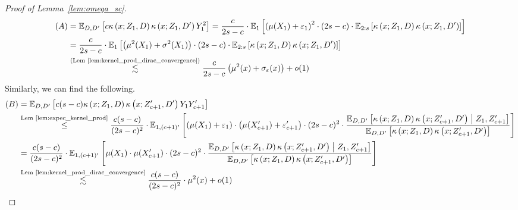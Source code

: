 \begin{proof}[Proof of Lemma~\ref{lem:omega_sc}]
\begin{equation}
		\begin{aligned}
            (A) & = 
			\mathbb{E}_{D, D^{\prime}}\left[c\kappa\left(x; Z_{1}, D\right)\kappa\left(x; Z_{1}, D^{\prime}\right)Y_{1}^{2}\right]
			= \frac{c}{2s-c} \cdot \mathbb{E}_{1}\left[\left(\mu(X_1) + \varepsilon_1\right)^2 \cdot (2s-c) \cdot \mathbb{E}_{2:s}\left[\kappa\left(x; Z_{1}, D\right)\kappa\left(x; Z_{1}, D^{\prime}\right)\right]\right] \\
            & = \frac{c}{2s-c} \cdot \mathbb{E}_{1}\left[\left(\mu^{2}(X_1) + \sigma^{2}(X_1)\right) \cdot (2s-c) \cdot \mathbb{E}_{2:s}\left[\kappa\left(x; Z_{1}, D\right)\kappa\left(x; Z_{1}, D^{\prime}\right)\right]\right]\\
		      & \overset{\text{(Lem~\ref{lem:kernel_prod_dirac_convergence})}}{\lesssim} \frac{c}{2s-c} \left(\mu^2(x) + \sigma_{\varepsilon}(x)\right) + o(1)
		\end{aligned}
	\end{equation}
	Similarly, we can find the following.
	\begin{equation}
		\begin{aligned}
            (B) & = \E_{D, D^{\prime}}\left[c(s-c) \kappa\left(x; Z_{1}, D\right)\kappa\left(x; Z_{c+1}^{\prime}, D^{\prime}\right)Y_{1}Y_{c+1}^{\prime}\right] \\
            & \overset{\text{Lem \ref{lem:expec_kernel_prod}}}{\leq} \frac{c(s-c)}{(2s-c)^2} \cdot
            \E_{1, (c+1)^{\prime}}\left[
                \left(\mu(X_1) + \varepsilon_{1}\right)\cdot\left(\mu(X_{c+1}^{\prime}) + \varepsilon_{c+1}^{\prime}\right) \cdot (2s-c)^2 
                \cdot \frac{\E_{D, D^{\prime}}\left[\kappa\left(x; Z_{1}, D\right)\kappa\left(x; Z_{c+1}^{\prime}, D^{\prime}\right) \; \middle| \; Z_{1}, Z_{c+1}^{\prime}\right]}{\E_{D, D^{\prime}}\left[\kappa\left(x; Z_{1}, D\right)\kappa\left(x; Z_{c+1}^{\prime}, D^{\prime}\right)\right]}
            \right]\\
            & = \frac{c(s-c)}{(2s-c)^2} \cdot
            \E_{1, (c+1)^{\prime}}\left[
                \mu(X_1) \cdot \mu(X_{c+1}^{\prime}) \cdot (2s-c)^2 
                \cdot \frac{\E_{D, D^{\prime}}\left[\kappa\left(x; Z_{1}, D\right)\kappa\left(x; Z_{c+1}^{\prime}, D^{\prime}\right) \; \middle| \; Z_{1}, Z_{c+1}^{\prime}\right]}{\E_{D, D^{\prime}}\left[\kappa\left(x; Z_{1}, D\right)\kappa\left(x; Z_{c+1}^{\prime}, D^{\prime}\right)\right]}
            \right]\\
			& \overset{\text{Lem \ref{lem:kernel_prod_dirac_convergence}}}{\lesssim}  \frac{c(s-c)}{(2s-c)^2} \cdot \mu^2(x) + o(1)

\end{aligned}
\end{equation}
\end{proof}
